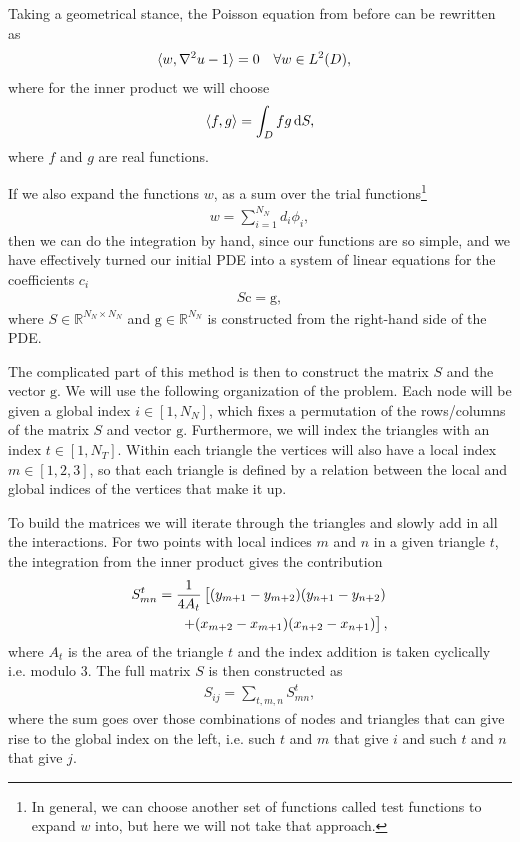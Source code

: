 \documentclass[10pt,a4paper,twocolumn]{article}
\renewcommand{\vec}[1]{\bm{\mathrm{#1}}}
\begin{document}
Taking a geometrical stance, the Poisson equation from before can be rewritten as
%
\begin{align}
    &\braket{w, \nabla^2 u - 1} = 0& &\forall w \in L^2(D),&
\end{align}
%
where for the inner product we will choose
%
\begin{align}
    \braket{f, g} = \int_{D} f g \dif S,
\end{align}
%
where $f$ and $g$ are real functions.

If we also expand the functions $w$, as a sum over the trial functions\footnote{In general, we can choose another set of functions called test functions to expand $w$ into, but here we will not take that approach.}
\begin{align}
    w = \sum_{i=1}^{N_N} d_i \phi_i,
\end{align}
%
then we can do the integration by hand, since our functions are so simple, and we have effectively turned our initial PDE into a system of linear equations for the coefficients $c_i$
%
\begin{align}
    S \vec{c} = \vec{g},
\end{align}
%
where $S \in \mathbb{R}^{N_N \times N_N}$ and $\vec{g} \in \mathbb{R}^{N_N}$ is constructed from the right-hand side of the PDE.

The complicated part of this method is then to construct the matrix $S$ and the vector $\vec{g}$. We will use the following organization of the problem. Each node will be given a global index $i \in [1, N_N]$, which fixes a permutation of the rows/columns of the matrix $S$ and vector $\vec{g}$. Furthermore, we will index the triangles with an index $t \in [1, N_T]$. Within each triangle the vertices will also have a local index $m \in [1, 2, 3]$, so that each triangle is defined by a relation between the local and global indices of the vertices that make it up.

To build the matrices we will iterate through the triangles and slowly add in all the interactions. For two points with local indices $m$ and $n$ in a given triangle $t$, the integration from the inner product gives the contribution
%
\begin{align}
    S^{t}_{mn} = \frac{1}{4 A_{t}}\left[ (y_{m+1} - y_{m+2})(y_{n+1} - y_{n+2}) \right. \notag\\ \left. + (x_{m+2} - x_{m+1})(x_{n+2} - x_{n+1}) \right],
\end{align}
%
where $A_t$ is the area of the triangle $t$ and the index addition is taken cyclically i.e. modulo $3$. The full matrix $S$ is then constructed as
%
\begin{align}
    S_{i j} = \sum_{t, m, n} S^{t}_{mn},
\end{align}
%
where the sum goes over those combinations of nodes and triangles that can give rise to the global index on the left, i.e. such $t$ and $m$ that give $i$ and such $t$ and $n$ that give $j$.
\end{document}
